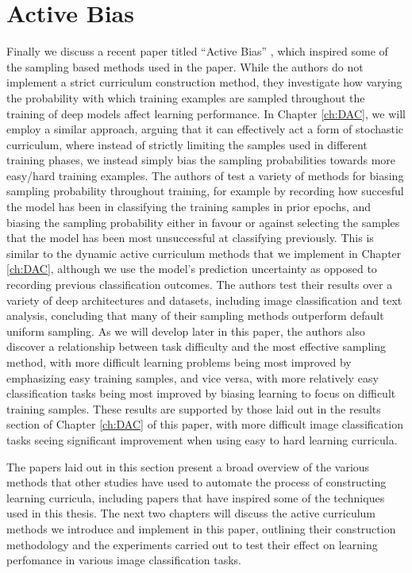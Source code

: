 \section{Active Bias}
Finally we discuss a recent paper titled ``Active Bias'' \cite{Chang18}, which inspired some of the sampling based methods used in the paper. While the authors do not implement a strict curriculum construction method, they investigate how varying the probability with which training examples are sampled throughout the training of deep models affect learning performance. In Chapter \ref{ch:DAC}, we will employ a similar approach, arguing that it can effectively act a form of stochastic curriculum, where instead of strictly limiting the samples used in different training phases, we instead simply bias the sampling probabilities towards more easy/hard training examples. The authors of \cite{Chang18} test a variety of methods for biasing sampling probability throughout training, for example by recording how succesful the model has been in classifying the training samples in prior epochs, and biasing the sampling probability either in favour or against selecting the samples that the model has been most unsuccessful at classifying previously. This is similar to the dynamic active curriculum methods that we implement in Chapter \ref{ch:DAC}, although we use the model's prediction uncertainty as opposed to recording previous classification outcomes. The authors test their results over a variety of deep architectures and datasets, including image classification and text analysis, concluding that many of their sampling methods outperform default uniform sampling. As we will develop later in this paper, the authors also discover a relationship between task difficulty and the most effective sampling method, with more difficult learning problems being most improved by emphasizing easy training samples, and vice versa, with more relatively easy classification tasks being most improved by biasing learning to focus on difficult training samples. These results are supported by those laid out in the results section of Chapter \ref{ch:DAC} of this paper, with more difficult image classification tasks seeing significant improvement when using easy to hard learning curricula. 

The papers laid out in this section present a broad overview of the various methods that other studies have used to automate the process of constructing learning curricula, including papers that have inspired some of the techniques used in this thesis. The next two chapters will discuss the active curriculum methods we introduce and implement in this paper, outlining their construction methodology and the experiments carried out to test their effect on learning perfomance in various image classification tasks.


